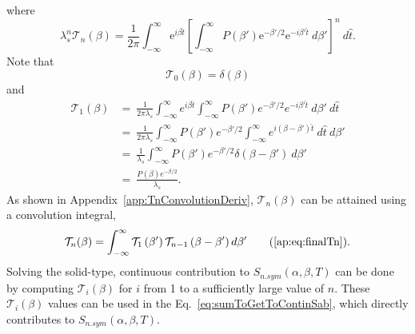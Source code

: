 \documentclass[../master.tex]{subfiles}
\begin{document}
				where
				\begin{equation}
					\lambda_s^n\mathcal{T}_n(\beta)=\frac{1}{2\pi}\int_{-\infty}^{\infty}\mathrm{e}^{i\beta\hat{t}}\left[\int_{-\infty}^{\infty}P(\beta')\mathrm{e}^{-\beta'/2}\mathrm{e}^{-i\beta'\hat{t}}~d\beta'\right]^n~d\hat{t}.
				\end{equation}
				Note that
				\begin{equation}
					\mathcal{T}_0(\beta)=\delta(\beta)
				\end{equation}
				and
				\begin{align}
					\mathcal{T}_1(\beta)&=~\frac{1}{2\pi\lambda_s}\int_{-\infty}^\infty e^{i\beta\hat{t}}\int_{-\infty}^\infty P(\beta')e^{-\beta'/2}e^{-i\beta'\hat{t}}~d\beta'~d\hat{t}\\
					&=~\frac{1}{2\pi\lambda_s}\int_{-\infty}^\infty P(\beta')e^{-\beta'/2} \int_{-\infty}^\infty e^{i(\beta-\beta')\hat{t}}~d\hat{t}~d\beta'\\
					&=~\frac{1}{\lambda_s}\int_{-\infty}^\infty P(\beta')e^{-\beta'/2} \delta(\beta-\beta')~d\beta'\\
					&=~\frac{P(\beta)e^{-\beta/2}}{\lambda_s}.
				\end{align}
				As shown in Appendix~\ref{app:TnConvolutionDeriv}, $\mathcal{T}_n(\beta)$ can be attained using a convolution integral,
				\begin{equation}
					\mathcal{T}_{n}(\beta)=\int_{-\infty}^{\infty}\mathcal{T}_{1}\left(\beta^{\prime}\right)\mathcal{T}_{n-1}\left(\beta-\beta^{\prime}\right)d\beta^{\prime}\tag{\ref{ap:eq:finalTn}}.
				\end{equation}
				Solving the solid-type, continuous contribution to $S_{n.sym}(\alpha,\beta,T)$ can be done by computing $\mathcal{T}_i(\beta)$ for $i$ from 1 to a sufficiently large value of $n$. These $\mathcal{T}_i(\beta)$ values can be used in the Eq.~\ref{eq:sumToGetToContinSab}, which directly contributes to $S_{n.sym}(\alpha,\beta,T)$.
\end{document}
